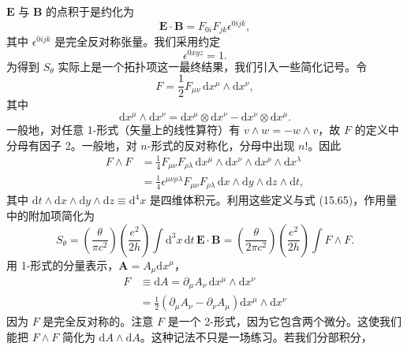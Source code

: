 $\mathbf{E}$ 与 $\mathbf{B}$ 的点积于是约化为
\begin{equation*}
\mathbf{E}\cdot\mathbf{B}=F_{0i}F_{jk}\epsilon^{0ijk},\tag{15.65}
\end{equation*}
其中 $\epsilon^{0ijk}$ 是完全反对称张量。我们采用约定
\begin{equation*}
\epsilon^{0xyz}=1.\tag{15.66}
\end{equation*}
为得到 $S_{\theta}$ 实际上是一个拓扑项这一最终结果，我们引入一些简化记号。令
\begin{equation*}
F=\frac{1}{2}F_{\mu\nu}\,\mathrm{d}x^{\mu}\wedge\mathrm{d}x^{\nu},\tag{15.67}
\end{equation*}
其中
\begin{equation*}
\mathrm{d}x^{\mu}\wedge\mathrm{d}x^{\nu}=\mathrm{d}x^{\mu}\otimes\mathrm{d}x^{\nu}-\mathrm{d}x^{\nu}\otimes\mathrm{d}x^{\mu}.\tag{15.68}
\end{equation*}
一般地，对任意 1-形式（矢量上的线性算符）有 $v\wedge w=-w\wedge v$，故 $F$ 的定义中分母有因子 2。一般地，对 $n$-形式的反对称化，分母中出现 $n!$。因此
\begin{align*}
F\wedge F&=\frac{1}{4}F_{\mu\nu}F_{\rho\lambda}\,\mathrm{d}x^{\mu}\wedge\mathrm{d}x^{\nu}\wedge\mathrm{d}x^{\rho}\wedge\mathrm{d}x^{\lambda}\\
&=\frac{1}{4}\epsilon^{\mu\nu\rho\lambda}F_{\mu\nu}F_{\rho\lambda}\,\mathrm{d}x\wedge\mathrm{d}y\wedge\mathrm{d}z\wedge\mathrm{d}t,\tag{15.69}
\end{align*}
其中 $\mathrm{d}t\wedge\mathrm{d}x\wedge\mathrm{d}y\wedge\mathrm{d}z\equiv\mathrm{d}^{4}x$ 是四维体积元。利用这些定义与式 (15.65)，作用量中的附加项简化为
\begin{equation*}
S_{\theta}=\left(\frac{\theta}{\pi c^{2}}\right)\left(\frac{e^{2}}{2h}\right)\int\mathrm{d}^{3}x\,\mathrm{d}t\,\mathbf{E}\cdot\mathbf{B}=\left(\frac{\theta}{2\pi c^{2}}\right)\left(\frac{e^{2}}{2h}\right)\int F\wedge F.\tag{15.70}
\end{equation*}
用 1-形式的分量表示，$\mathbf{A}=A_{\mu}\mathrm{d}x^{\mu}$，
\begin{align*}
F&\equiv\mathrm{d}A=\partial_{\mu}A_{\nu}\,\mathrm{d}x^{\mu}\wedge\mathrm{d}x^{\nu}\\
&=\frac{1}{2}\left(\partial_{\mu}A_{\nu}-\partial_{\nu}A_{\mu}\right)\mathrm{d}x^{\mu}\wedge\mathrm{d}x^{\nu}\tag{15.71}
\end{align*}
因为 $F$ 是完全反对称的。注意 $F$ 是一个 2-形式，因为它包含两个微分。这使我们能把 $F\wedge F$ 简化为 $\mathrm{d}A\wedge\mathrm{d}A$。这种记法不只是一场练习。若我们分部积分，

